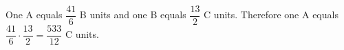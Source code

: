 One A equals $\dfrac{41}{6}$ B units and one B equals $\dfrac{13}{2}$ C units. Therefore one A equals $\dfrac{41}{6}\cdot\dfrac{13}{2}=\boxed{\dfrac{533}{12}}$ C units.

